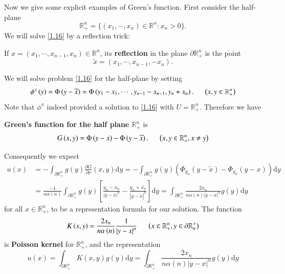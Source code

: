 Now we give some explicit examples of Green's function. First consider the half-plane 
$$\mathbb{R}_+^n=\{(x_1,\cdots,x_n)\in\mathbb{R}^n:x_n>0\}.$$
We will solve \eqref{1.16} by a reflection trick: 
\begin{definition}
If $x=(x_1,\cdots,x_{n-1},x_n)\in\mathbb{R}^n$, its \textbf{reflection} in the plane $\partial\mathbb{R}_+^n$ is the point 
$$\widetilde{x}=(x_1,\cdots,x_{n-1},-x_n).$$
\end{definition}
We will solve problem \eqref{1.16} for the half-plane by setting 
$$
\phi ^x\left( y \right) =\Phi \left( y-\widetilde{x} \right) =\Phi \left( y_1-x_1,\cdots ,y_{n-1}-x_{n-1},y_n+x_n \right) .\hspace{0.5cm}\left( x,y\in \mathbb{R} _{+}^{n} \right) 
$$
Note that $\phi^x$ indeed provided a solution to \eqref{1.16} with $U=\mathbb{R}_+^n$. Therefore we have 
\begin{definition}
\textbf{Green's function for the half plane $\mathbb{R}_+^n$} is 
$$
G\left( x,y \right) =\Phi \left( y-x \right) -\Phi \left( y-\widetilde{x} \right) .\hspace{0.5cm}\left( x,y\in \mathbb{R} _{+}^{n},x\ne y \right) 
$$
\end{definition}
Consequently we expect 
$$
\begin{aligned}
u\left( x \right) &=-\int_{\partial \mathbb{R} _{+}^{n}}{g\left( y \right) \frac{\partial G}{\partial \nu}\left( x,y \right) \mathrm{d}y}=-\int_{\partial \mathbb{R} _{+}^{n}}{g\left( y \right) \left( \Phi _{y_n}\left( y-\widetilde{x} \right) -\Phi _{y_n}\left( y-x \right) \right) \mathrm{d}y}
\\
&=\frac{-1}{n\alpha \left( n \right)}\int_{\partial \mathbb{R} _{+}^{n}}{g\left( y \right) \left[ \frac{y_n-x_n}{\left| y-x \right|^n}-\frac{y_n+\widetilde{x_n}}{\left| y-\widetilde{x} \right|^n} \right] \mathrm{d}y}=\int_{\partial \mathbb{R} _{+}^{n}}{\frac{2x_n}{n\alpha \left( n \right) \left| y-x \right|^n}g\left( y \right) \mathrm{d}y}
\end{aligned}
$$
for all $x\in\mathbb{R}_+^n$, to be a representation formula for our solution. The function 
$$
K\left( x,y \right) =\frac{2x_n}{n\alpha \left( n \right)}\frac{1}{\left| y-x \right|^n}\hspace{0.5cm}\left( x\in \mathbb{R} _{+}^{n},y\in \partial \mathbb{R} _{n}^{+} \right) 
$$
is \textbf{Poisson kernel} for $\mathbb{R}_+^n$, and the representation 
\begin{equation}\label{1.20}
u\left( x \right) =\int_{\partial \mathbb{R} _{+}^{n}}{K\left( x,y \right) g\left( y \right) \mathrm{d}y}=\int_{\partial \mathbb{R} _{+}^{n}}{\frac{2x_n}{n\alpha \left( n \right) \left| y-x \right|^n}g\left( y \right) \mathrm{d}y}
\end{equation}
